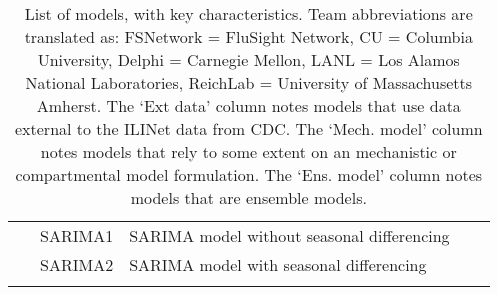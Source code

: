 \begin{table}
\begin{tabular}{p{1.6cm} l p{7.5cm} c  p{1cm}  }
~        & SARIMA1            & SARIMA model without seasonal differencing && \cite{Ray2018}  \\ 
~        & SARIMA2            & SARIMA model with seasonal differencing & & \cite{Ray2018}     \\ 
          \\ 
\end{tabular}
\caption{List of models, with key characteristics. Team abbreviations are translated as: FSNetwork = FluSight Network, CU = Columbia University, Delphi = Carnegie Mellon, LANL = Los Alamos National Laboratories, ReichLab = University of Massachusetts Amherst.  The `Ext data' column notes models that use data external to the ILINet data from CDC. The `Mech. model' column notes models that rely to some extent on an mechanistic or compartmental model formulation. The `Ens. model' column notes models that are ensemble models.}
\label{tab:model-list}
\end{table}